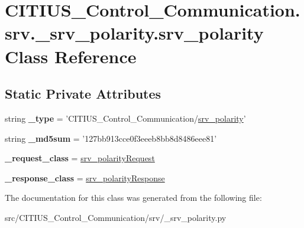 \hypertarget{class_c_i_t_i_u_s___control___communication_1_1srv_1_1__srv__polarity_1_1srv__polarity}{\section{\-C\-I\-T\-I\-U\-S\-\_\-\-Control\-\_\-\-Communication.\-srv.\-\_\-srv\-\_\-polarity.\-srv\-\_\-polarity \-Class \-Reference}
\label{class_c_i_t_i_u_s___control___communication_1_1srv_1_1__srv__polarity_1_1srv__polarity}
}
\subsection*{\-Static \-Private \-Attributes}
\begin{DoxyCompactItemize}
\item 
\hypertarget{class_c_i_t_i_u_s___control___communication_1_1srv_1_1__srv__polarity_1_1srv__polarity_adfbc65166c6e55fc31e62b2293a78e94}{string {\bfseries \-\_\-type} = '\-C\-I\-T\-I\-U\-S\-\_\-\-Control\-\_\-\-Communication/\hyperlink{class_c_i_t_i_u_s___control___communication_1_1srv_1_1__srv__polarity_1_1srv__polarity}{srv\-\_\-polarity}'}\label{class_c_i_t_i_u_s___control___communication_1_1srv_1_1__srv__polarity_1_1srv__polarity_adfbc65166c6e55fc31e62b2293a78e94}

\item 
\hypertarget{class_c_i_t_i_u_s___control___communication_1_1srv_1_1__srv__polarity_1_1srv__polarity_af232da30293035588f8e66a180e579a7}{string {\bfseries \-\_\-md5sum} = '127bb913cce0f3eeeb8bb8d8486eee81'}\label{class_c_i_t_i_u_s___control___communication_1_1srv_1_1__srv__polarity_1_1srv__polarity_af232da30293035588f8e66a180e579a7}

\item 
\hypertarget{class_c_i_t_i_u_s___control___communication_1_1srv_1_1__srv__polarity_1_1srv__polarity_a2e11c5d079679182c52f83d1fc8c795d}{{\bfseries \-\_\-request\-\_\-class} = \hyperlink{class_c_i_t_i_u_s___control___communication_1_1srv_1_1__srv__polarity_1_1srv__polarity_request}{srv\-\_\-polarity\-Request}}\label{class_c_i_t_i_u_s___control___communication_1_1srv_1_1__srv__polarity_1_1srv__polarity_a2e11c5d079679182c52f83d1fc8c795d}

\item 
\hypertarget{class_c_i_t_i_u_s___control___communication_1_1srv_1_1__srv__polarity_1_1srv__polarity_a26e1987c3cc483d2d5cd082acef44209}{{\bfseries \-\_\-response\-\_\-class} = \hyperlink{class_c_i_t_i_u_s___control___communication_1_1srv_1_1__srv__polarity_1_1srv__polarity_response}{srv\-\_\-polarity\-Response}}\label{class_c_i_t_i_u_s___control___communication_1_1srv_1_1__srv__polarity_1_1srv__polarity_a26e1987c3cc483d2d5cd082acef44209}

\end{DoxyCompactItemize}


\-The documentation for this class was generated from the following file\-:\begin{DoxyCompactItemize}
\item 
src/\-C\-I\-T\-I\-U\-S\-\_\-\-Control\-\_\-\-Communication/srv/\-\_\-srv\-\_\-polarity.\-py\end{DoxyCompactItemize}
